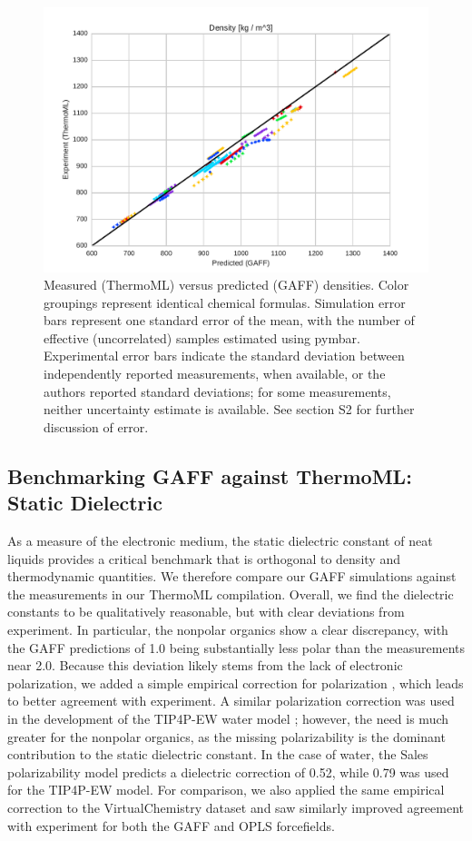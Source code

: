\documentclass[journal=jacsat,manuscript=article]{achemso}
\begin{document}
\begin{figure}
\includegraphics[width=\columnwidth]{./figures/densities_thermoml.pdf}
\caption{Measured (ThermoML) versus predicted (GAFF) densities.  Color groupings represent identical chemical formulas.  Simulation error bars represent one standard error of the mean, with the number of effective (uncorrelated) samples estimated using pymbar.  Experimental error bars indicate the standard deviation between independently reported measurements, when available, or the authors reported standard deviations; for some measurements, neither uncertainty estimate is available.  See section S2 for further discussion of error.
}
\label{figure:Density}
\end{figure}


\subsection{Benchmarking GAFF against ThermoML: Static Dielectric}

As a measure of the electronic medium, the static dielectric constant of neat liquids provides a critical benchmark that is orthogonal to density and thermodynamic quantities.  We therefore compare our GAFF simulations against the measurements in our ThermoML compilation.  Overall, we find the dielectric constants to be qualitatively reasonable, but with clear deviations from experiment.  In particular, the nonpolar organics show a clear discrepancy, with the GAFF predictions of 1.0 being substantially less polar than the measurements near 2.0.  Because this deviation likely stems from the lack of electronic polarization, we added a simple empirical correction for polarization \cite{bosque2002polarizabilities}, which leads to better agreement with experiment.  A similar polarization correction was used in the development of the TIP4P-EW water model \cite{horn2004}; however, the need is much greater for the nonpolar organics, as the missing polarizability is the dominant contribution to the static dielectric constant.  In the case of water, the Sales polarizability model predicts a dielectric correction of 0.52, while 0.79 was used for the TIP4P-EW model.  For comparison, we also applied the same empirical correction to the VirtualChemistry dataset \cite{caleman2011force, van2012gromacs} and saw similarly improved agreement with experiment for both the GAFF and OPLS forcefields.
\end{document}
